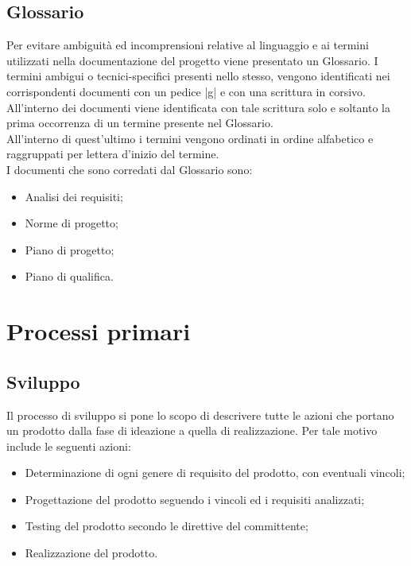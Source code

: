 \documentclass[10pt, a4paper]{article}
\begin{document}
\subsection{Glossario}
Per evitare ambiguità ed incomprensioni relative al linguaggio e ai termini utilizzati nella documentazione del progetto viene presentato un Glossario. I termini ambigui o tecnici-specifici presenti nello stesso, vengono identificati nei corrispondenti documenti con un pedice |g| e con una scrittura in corsivo.
All'interno dei documenti viene identificata con tale scrittura solo e soltanto la prima occorrenza di un termine presente nel Glossario.\\All'interno di quest'ultimo i termini vengono ordinati in ordine alfabetico e raggruppati per lettera d'inizio del termine.\\
I documenti che sono corredati dal Glossario sono:
\begin{itemize}
    \item Analisi dei requisiti;
    \item Norme di progetto;
    \item Piano di progetto;
    \item Piano di qualifica.
\end{itemize}

\newpage
\section{Processi primari}
\subsection{Sviluppo}
Il processo di sviluppo si pone lo scopo di descrivere tutte le azioni che portano un prodotto dalla fase di ideazione a quella di realizzazione. Per tale motivo include le seguenti azioni:
\begin{itemize}
    \item Determinazione di ogni genere di requisito del prodotto, con eventuali vincoli;
    \item Progettazione del prodotto seguendo i vincoli ed i requisiti analizzati;
    \item Testing del prodotto secondo le direttive del committente;
    \item Realizzazione del prodotto.
\end{itemize}
\end{document}
